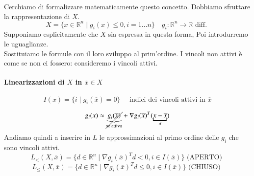 Cerchiamo di formalizzare matematicamente questo concetto.
Dobbiamo sfruttare la rappresentazione di $X$.
$$ X  = \{x \in \mathbb{R}^{n} \; | \; g_i(x) \leq 0 , i = 1 \ldots n \}
\quad g_i: \mathbb{R}^{n} \rightarrow \mathbb{R} \text{ diff. }
$$
Supponiamo esplicitamente che $X$ sia espressa in questa forma,
Poi introdurremo le uguaglianze. \\
Sostituiamo le formule con il loro sviluppo al prim'ordine.
I  vincoli non attivi \`e come se non ci fossero: consideremo i
vincoli attivi.
\paragraph{Linearizzazioni di $X$ in $\overline{x} \in X$}

$$I(x) = \{ i \; | \; g_i(\overline{x}) = 0 \}
\quad \text{ indici dei vincoli attivi in } \overline{x}
$$

$$ g_i(x) \approx \cancel{\underbrace{g_i(\overline{x})}_{\text{se attivo}}} + \nabla g_i(\overline{x})^{T}(\underbracket{x-\overline{x}}_{d})$$
Andiamo quindi a inserire in $L$ le approssimazioni al primo
ordine delle $g_i$ che sono vincoli attivi.
$$L_{<}(X, \overline{x}) = \{ d \in \mathbb{R}^{n} \; | \;
\nabla g_i(\overline{x})^{T}d < 0, i \in I(\overline{x}) \} \text{ (APERTO) } $$
$$L_{\leq}(X, \overline{x}) = \{ d \in \mathbb{R}^{n} \; | \;
\nabla g_i(\overline{x})^{T}d \leq 0, i \in I(\overline{x}) \} \text{ (CHIUSO) } $$

